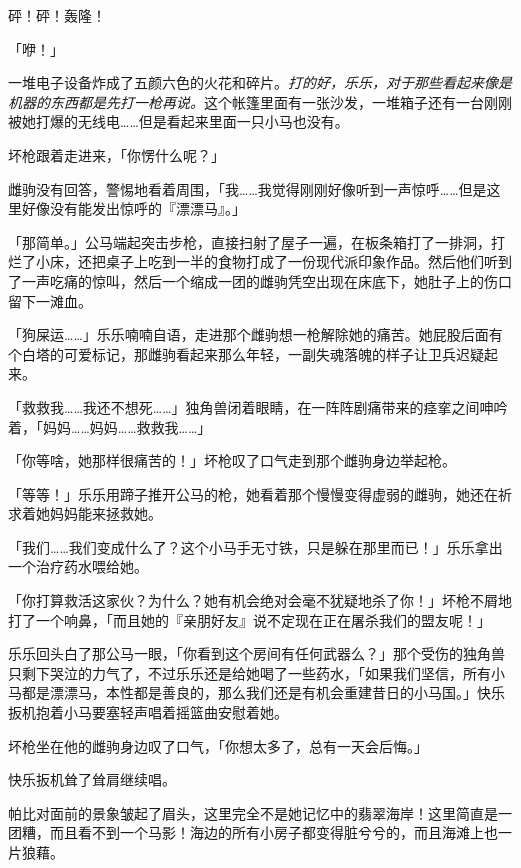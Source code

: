 砰！砰！轰隆！

「咿！」

一堆电子设备炸成了五颜六色的火花和碎片。\emph{打的好，乐乐，对于那些看起来像是机器的东西都是先打一枪再说。}这个帐篷里面有一张沙发，一堆箱子还有一台刚刚被她打爆的无线电……但是看起来里面一只小马也没有。


坏枪跟着走进来，「你愣什么呢？」

雌驹没有回答，警惕地看着周围，「我……我觉得刚刚好像听到一声惊呼……但是这里好像没有能发出惊呼的『漂漂马』。」

「那简单。」公马端起突击步枪，直接扫射了屋子一遍，在板条箱打了一排洞，打烂了小床，还把桌子上吃到一半的食物打成了一份现代派印象作品。然后他们听到了一声吃痛的惊叫，然后一个缩成一团的雌驹凭空出现在床底下，她肚子上的伤口留下一滩血。

「狗屎运……」乐乐喃喃自语，走进那个雌驹想一枪解除她的痛苦。她屁股后面有个白塔的可爱标记，那雌驹看起来那么年轻，一副失魂落魄的样子让卫兵迟疑起来。

「救救我……我还不想死……」独角兽闭着眼睛，在一阵阵剧痛带来的痉挛之间呻吟着，「妈妈……妈妈……救救我……」

「你等啥，她那样很痛苦的！」坏枪叹了口气走到那个雌驹身边举起枪。

「等等！」乐乐用蹄子推开公马的枪，她看着那个慢慢变得虚弱的雌驹，她还在祈求着她妈妈能来拯救她。

「我们……我们变成什么了？这个小马手无寸铁，只是躲在那里而已！」乐乐拿出一个治疗药水喂给她。

「你打算救活这家伙？为什么？她有机会绝对会毫不犹疑地杀了你！」坏枪不屑地打了一个响鼻，「而且她的『亲朋好友』说不定现在正在屠杀我们的盟友呢！」

乐乐回头白了那公马一眼，「你看到这个房间有任何武器么？」那个受伤的独角兽只剩下哭泣的力气了，不过乐乐还是给她喝了一些药水，「如果我们坚信，所有小马都是漂漂马，本性都是善良的，那么我们还是有机会重建昔日的小马国。」快乐扳机抱着小马要塞轻声唱着摇篮曲安慰着她。

坏枪坐在他的雌驹身边叹了口气，「你想太多了，总有一天会后悔。」

快乐扳机耸了耸肩继续唱。

\horizonline


帕比对面前的景象皱起了眉头，这里完全不是她记忆中的翡翠海岸！这里简直是一团糟，而且看不到一个马影！海边的所有小房子都变得脏兮兮的，而且海滩上也一片狼藉。

